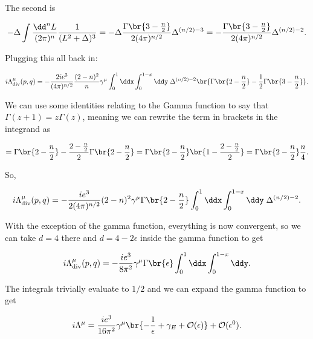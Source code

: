 \documentclass[titlepage]{article}
\begin{document}
The second is

\begin{equation}
    -\Delta\int \frac{\dd^nL}{(2\pi)^n} \frac{1}{(L^2 + \Delta)^3} = -\Delta\frac{\Gamma\br{3 - \frac{n}{2}}}{2(4\pi)^{n/2}}\Delta^{(n/2)-3} = -\frac{\Gamma\br{3 - \frac{n}{2}}}{2(4\pi)^{n/2}}\Delta^{(n/2)-2}.
\end{equation}

Plugging this all back in:

\begin{equation}
    i\Lambda^{\mu}_{\mathrm{div}}(p,q) = -\frac{2ie^3}{(4\pi)^{n/2}}\frac{(2-n)^2}{n}\gamma^{\mu} \int_0^1\ddx \int_0^{1-x}\ddy \; \Delta^{(n/2)-2}\br{\Gamma\br{2 - \frac{n}{2}} - \frac{1}{2}\Gamma\br{3 - \frac{n}{2}}}.
\end{equation}

We can use some identities relating to the Gamma function to say that $\Gamma(z+1) = z\Gamma(z)$, meaning we can rewrite the term in brackets in the integrand as

\begin{equation}
    = \Gamma\br{2 - \frac{n}{2}} - \frac{2 - \frac{n}{2}}{2}\Gamma\br{2 - \frac{n}{2}} = \Gamma\br{2 - \frac{n}{2}}\br{1 - \frac{2 - \frac{n}{2}}{2}} = \Gamma\br{2 - \frac{n}{2}} \frac{n}{4}.
\end{equation}

So,

\begin{equation}
    i\Lambda^{\mu}_{\mathrm{div}}(p,q) = -\frac{ie^3}{2(4\pi)^{n/2}}(2-n)^2\gamma^{\mu} \Gamma\br{2 - \frac{n}{2}} \int_0^1\ddx \int_0^{1-x}\ddy \; \Delta^{(n/2)-2}.\label{eq:1}
\end{equation}

With the exception of the gamma function, everything is now convergent, so we can take $d=4$ there and $d=4-2\epsilon$ inside the gamma function to get

\begin{equation}
    i\Lambda^{\mu}_{\mathrm{div}}(p,q) = -\frac{ie^3}{8\pi^2}\gamma^{\mu} \Gamma\br{\epsilon} \int_0^1\ddx \int_0^{1-x}\ddy.
\end{equation}

The integrals trivially evaluate to $1/2$ and we can expand the gamma function to get

\begin{equation}
    i\Lambda^{\mu} = \frac{ie^3}{16\pi^2}\gamma^\mu\br{-\frac{1}{\epsilon} + \gamma_E + \mathcal{O}(\epsilon)} + \mathcal{O}(\epsilon^0).
\end{equation}
\end{document}
